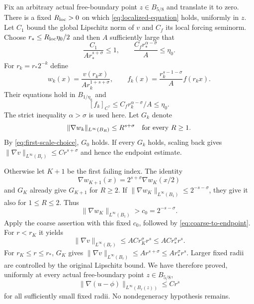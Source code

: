 \documentclass[11pt]{article}
\numberwithin{equation}{section}
\begin{document}
Fix an arbitrary actual free-boundary point $z\in B_{5/8}$ and translate
it to zero. There is a fixed $R_{\rm loc}>0$ on which
\eqref{eq:localized-equation} holds, uniformly in $z$. Let $C_1$ bound
the global Lipschitz norm of $v$ and $C_f$ its local forcing seminorm.
Choose $r_*\leq R_{\rm loc}\eta_0/2$ and then $A$ sufficiently large that
\begin{equation}\label{eq:first-scale-choice}
 \frac{C_1}{Ar_*^{s+\sigma}}\leq1,\qquad
                     \frac{C_f r_*^{\alpha-\sigma}}A\leq\eta_0.
\end{equation}
For $r_k=r_*2^{-k}$ define
\begin{equation}\label{eq:dyadic-normalization}
 w_k(x)=\frac{v(r_kx)}{Ar_k^{1+s+\sigma}},\qquad
 f_k(x)=\frac{r_k^{s-1-\sigma}}A f(r_kx).
\end{equation}
Their equations hold in $B_{1/\eta_0}$ and
\[
                 [f_k]_{C^\gamma}\leq C_f r_k^{\alpha-\sigma}/A
                                             \leq\eta_0.
\]
The strict inequality $\alpha>\sigma$ is used here. Let $G_k$ denote
\begin{equation}\label{eq:Gk}
          \|\nabla w_k\|_{L^\infty(B_R)}\leq R^{s+\sigma}
                                      \quad\hbox{for every }R\geq1.
\end{equation}
By \eqref{eq:first-scale-choice}, $G_0$ holds. If every $G_k$ holds, scaling
back gives $\|\nabla v\|_{L^\infty(B_r)}\leq Cr^{s+\sigma}$ and hence
the endpoint estimate.

Otherwise let $K+1$ be the first failing index. The identity
\[
             \nabla w_{K+1}(x)=2^{s+\sigma}\nabla w_K(x/2)
\]
and $G_K$ already give $G_{K+1}$ for $R\geq2$. If
$\|\nabla w_K\|_{L^\infty(B_1)}\leq2^{-s-\sigma}$, they give it also
for $1\leq R\leq2$. Thus
\[
              \|\nabla w_K\|_{L^\infty(B_1)}>c_0=2^{-s-\sigma}.
\]
Apply the coarse assertion with this fixed $c_0$, followed by
\eqref{eq:coarse-to-endpoint}. For $r<r_K$ it yields
\[
 \|\nabla v\|_{L^\infty(B_r)}\leq AC r_K^\sigma r^s
                                           \leq AC r_*^\sigma r^s.
\]
For $r_K\leq r\leq r_*$, $G_K$ gives
$\|\nabla v\|_{L^\infty(B_r)}\leq Ar^{s+\sigma}
\leq Ar_*^\sigma r^s$. Larger fixed radii are controlled by the original
Lipschitz bound. We have therefore proved, uniformly at every actual
free-boundary point $z\in B_{5/8}$,
\begin{equation}\label{eq:one-point-original}
       \|\nabla(u-\phi)\|_{L^\infty(B_r(z))}\leq Cr^s
\end{equation}
for all sufficiently small fixed radii. No nondegeneracy hypothesis remains.
\end{document}
